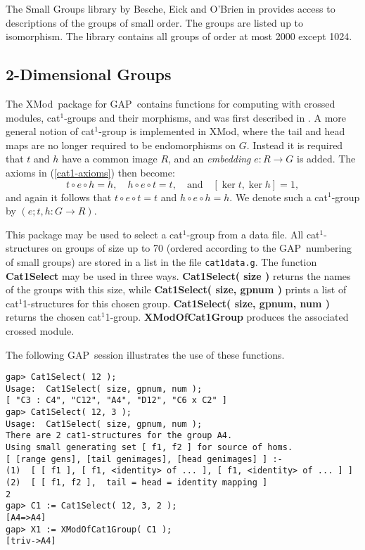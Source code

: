 \documentclass{ws-ijac}
\newcommand{\GAP}      {{\sf GAP}}
\newcommand{\XMod}     {{\sf XMod}}
\begin{document}
The Small Groups library by Besche, Eick and O'Brien in \cite{besche-eick-obrien} 
provides access to descriptions of the groups of small order. 
The groups are listed up to isomorphism. 
The library contains all groups of order at most 2000 except 1024.


\subsection{2-Dimensional Groups}

The \XMod\ package for \GAP\ contains functions for computing with 
crossed modules, cat$^{1}$-groups and their morphisms, 
and was first described in \cite{xmod}. 
A more general notion of cat$^1$-group is implemented in \XMod, 
where the tail and head maps are no longer required to be endomorphisms on $G$. 
Instead it is required that $t$ and $h$ have a common image $R$, 
and an \emph{embedding} $e : R \to G$ is added.  
The axioms in (\ref{cat1-axioms}) then become:  
\[ 
t \circ e \circ h = h, \quad  
h \circ e \circ t = t, 
\quad \mbox{and}\quad  [\ker t,\ker h] = 1, 
\] 
and again it follows that $t \circ e \circ t = t$ and $h \circ e \circ h = h$. 
We denote such a cat$^1$-group by $(e;t,h : G \to R)$. 


This package may be used to select a cat$^{1}$-group from a data file. 
All cat$^{1}$-structures on groups of size up to 70 
(ordered according to the \GAP\ numbering of small groups) 
are stored in a list in the file \texttt{cat1data.g}.
The function \textbf{Cat1Select} may be used in three ways. 
\textbf{Cat1Select( size )} returns the names of the groups with this size, 
while \textbf{Cat1Select( size, gpnum )} prints a list of cat$^1$1-structures 
for this chosen group. 
\textbf{Cat1Select( size, gpnum, num )} returns the chosen cat$^1$1-group.
\textbf{XModOfCat1Group} produces the associated crossed module. 

The following \GAP\ session illustrates the use of these functions.

\small{
\begin{verbatim}
gap> Cat1Select( 12 ); 
Usage:  Cat1Select( size, gpnum, num );
[ "C3 : C4", "C12", "A4", "D12", "C6 x C2" ]
gap> Cat1Select( 12, 3 ); 
Usage:  Cat1Select( size, gpnum, num );
There are 2 cat1-structures for the group A4.
Using small generating set [ f1, f2 ] for source of homs.
[ [range gens], [tail genimages], [head genimages] ] :-
(1)  [ [ f1 ], [ f1, <identity> of ... ], [ f1, <identity> of ... ] ]
(2)  [ [ f1, f2 ],  tail = head = identity mapping ]
2
gap> C1 := Cat1Select( 12, 3, 2 ); 
[A4=>A4]
gap> X1 := XModOfCat1Group( C1 ); 
[triv->A4]
\end{verbatim}
}
\end{document}
